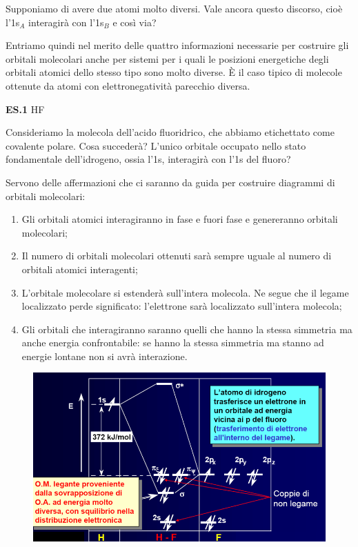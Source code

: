 Supponiamo di avere due atomi molto diversi. Vale ancora questo discorso, cioè l'1s$_A$ interagirà con l'1s$_B$ e così via?

Entriamo quindi nel merito delle quattro informazioni necessarie per costruire gli orbitali molecolari anche per sistemi per i quali le posizioni energetiche degli orbitali atomici dello stesso tipo sono molto diverse. È il caso tipico di molecole ottenute da atomi con elettronegatività parecchio diversa.

\vspace{0.2cm}\textbf{ES.1} HF

Consideriamo la molecola dell'acido fluoridrico, che abbiamo etichettato come covalente polare. Cosa succederà? L'unico orbitale occupato nello stato fondamentale dell'idrogeno, ossia l'1s, interagirà con l'1s del fluoro?

\vspace{0.2cm}Servono delle affermazioni che ci saranno da guida per costruire diagrammi di orbitali molecolari:

\begin{enumerate}
    \item Gli orbitali atomici interagiranno in fase e fuori fase e genereranno orbitali molecolari;
    \item Il numero di orbitali molecolari ottenuti sarà sempre uguale al numero di orbitali atomici interagenti;
    \item L'orbitale molecolare si estenderà sull'intera molecola. Ne segue che il legame localizzato perde significato: l'elettrone sarà localizzato sull'intera molecola;
    \item Gli orbitali che interagiranno saranno quelli che hanno la stessa simmetria ma anche energia confrontabile: se hanno la stessa simmetria ma stanno ad energie lontane non si avrà interazione.
\end{enumerate}

\begin{figure}[htp]
    \centering
    \includegraphics[width=13cm]{immagini/orbitali_molecolari_HF.png}
\end{figure}

